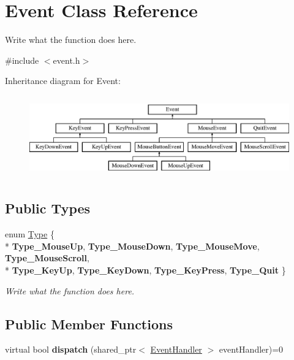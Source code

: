 \hypertarget{classEvent}{\section{Event Class Reference}
\label{classEvent}
}


Write what the function does here.  




{\ttfamily \#include $<$event.\+h$>$}

Inheritance diagram for Event\+:\begin{figure}[H]
\begin{center}
\leavevmode
\includegraphics[height=3.584000cm]{classEvent}
\end{center}
\end{figure}
\subsection*{Public Types}
\begin{DoxyCompactItemize}
\item 
enum \hyperlink{classEvent_a2abf13b5be49315e9e362af02029f058}{Type} \{ \\*
{\bfseries Type\+\_\+\+Mouse\+Up}, 
{\bfseries Type\+\_\+\+Mouse\+Down}, 
{\bfseries Type\+\_\+\+Mouse\+Move}, 
{\bfseries Type\+\_\+\+Mouse\+Scroll}, 
\\*
{\bfseries Type\+\_\+\+Key\+Up}, 
{\bfseries Type\+\_\+\+Key\+Down}, 
{\bfseries Type\+\_\+\+Key\+Press}, 
{\bfseries Type\+\_\+\+Quit}
 \}
\begin{DoxyCompactList}\small\item\em Write what the function does here. \end{DoxyCompactList}\end{DoxyCompactItemize}
\subsection*{Public Member Functions}
\begin{DoxyCompactItemize}
\item 
\hypertarget{classEvent_a505136f7f21d062f315cf4827c939068}{virtual bool {\bfseries dispatch} (shared\+\_\+ptr$<$ \hyperlink{structEventHandler}{Event\+Handler} $>$ event\+Handler)=0}\label{classEvent_a505136f7f21d062f315cf4827c939068}

\end{DoxyCompactItemize}
